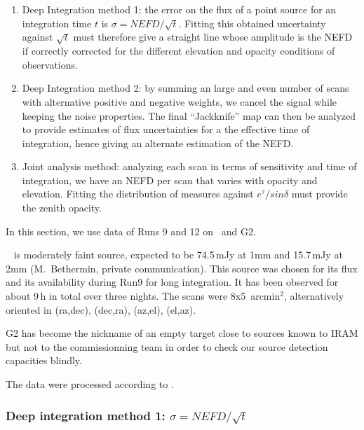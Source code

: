 \begin{enumerate}
\item Deep Integration method 1: the error on the flux of a point source for an
  integration time $t$ is $\sigma = NEFD/\sqrt{t}$. Fitting this obtained
  uncertainty against $\sqrt{t}$ must therefore give a straight line whose
  amplitude is the NEFD if correctly corrected for the different elevation and
  opacity conditions of observations.
\item Deep Integration method 2: by summing an large and even number of scans
  with alternative positive and negative weights, we cancel the signal while
  keeping the noise properties. The final ``Jackknife'' map can then be analyzed
  to provide estimates of flux uncertainties for a the effective time of
  integration, hence giving an alternate estimation of the NEFD.
\item Joint analysis method: analyzing each scan in terms of sensitivity and
  time of integration, we have an NEFD per scan that varies with opacity and
  elevation. Fitting the distribution of measures against $e^\tau/sin\delta$
  must provide the zenith opacity.
\end{enumerate}

In this section, we use data of Runs 9 and 12  on \hls\ and G2.

\hls\ \cite{hls_combes} is moderately faint source, expected to be 74.5\,mJy at
1mm and 15.7\,mJy at 2mm (M.~Bethermin, private communication). This source was
chosen for its flux and its availability during Run9 for long integration. It
has been observed for about 9\,h in total over three nights. The scans were
8x5~arcmin$^2$, alternatively oriented in (ra,dec), (dec,ra), (az,el),
(el,az).

G2 has become the nickname of an empty target close to sources known to IRAM but
not to the commissionning team in order to check our source detection capacities blindly.

The data were processed according to .

\subsubsection{Deep integration method 1: $\sigma = NEFD/\sqrt{t}$}


